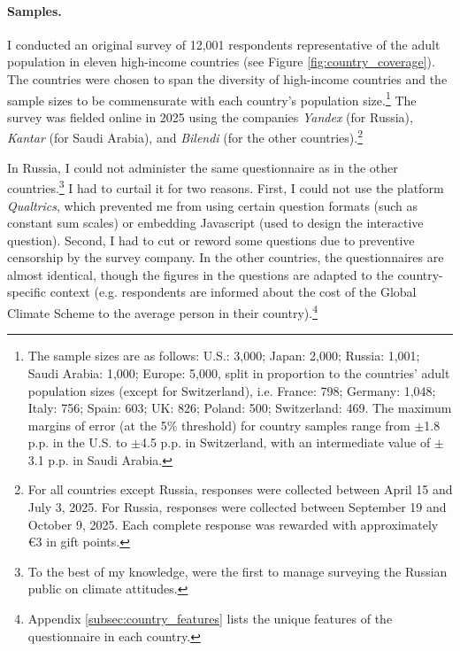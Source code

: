 \documentclass[12pt,english]{article}
\begin{document}
\begin{bibunit}
\paragraph{Samples.}
I conducted an original survey of 12,001 respondents representative of the adult population in eleven high-income countries (see Figure \ref{fig:country_coverage}). The countries were chosen to span the diversity of high-income countries and the sample sizes to be commensurate with each country's population size.\footnote{The sample sizes are as follows: U.S.: 3,000; Japan: 2,000; Russia: 1,001; Saudi Arabia: 1,000; Europe: 5,000, split in proportion to the countries' adult population sizes (except for Switzerland), i.e. France: 798; Germany: 1,048; Italy: 756; Spain: 603; UK: 826; Poland: 500; Switzerland: 469. The maximum margins of error (at the 5\% threshold) for country samples range from $\pm$1.8 p.p. in the U.S. to $\pm$4.5 p.p. in Switzerland, with an intermediate value of $\pm$3.1 p.p. in Saudi Arabia. } 
The survey was fielded online in 2025 using the companies \textit{Yandex} (for Russia), \textit{Kantar} (for Saudi Arabia), and \textit{Bilendi} (for the other countries).\footnote{For all countries except Russia, responses were collected between April 15 and July 3, 2025. For Russia, responses were collected between September 19 and October 9, 2025. Each complete response was rewarded with approximately \euro{}3 in gift points.} 

In Russia, I could not administer the same questionnaire as in the other countries.\footnote{To the best of my knowledge, \cite{toews_learning_2025} were the first to manage surveying the Russian public on climate attitudes.} I had to curtail it for two reasons. First, I could not use the platform \textit{Qualtrics}, which prevented me from using certain question formats (such as constant sum scales) or embedding Javascript (used to design the interactive question). Second, I had to cut or reword some questions due to preventive censorship by the survey company. In the other countries, the questionnaires are almost identical, though the figures in the questions are adapted to the country-specific context (e.g. respondents are informed about the cost of the Global Climate Scheme to the average person in their country).\footnote{Appendix \ref{subsec:country_features} lists the unique features of the questionnaire in each country.}


\end{bibunit}
\end{document}
